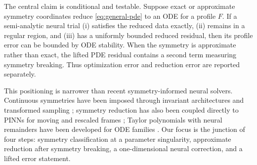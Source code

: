 \documentclass[11pt]{article}
\begin{document}
The central claim is conditional and testable.  Suppose exact or approximate symmetry coordinates reduce \cref{eq:general-pde} to an ODE for a profile $F$.  If a semi-analytic neural trial (i) satisfies the reduced data exactly, (ii) remains in a regular region, and (iii) has a uniformly bounded reduced residual, then its profile error can be bounded by ODE stability.  When the symmetry is approximate rather than exact, the lifted PDE residual contains a second term measuring symmetry breaking.  Thus optimization error and reduction error are reported separately.

This positioning is narrower than recent symmetry-informed neural solvers.  Continuous symmetries have been imposed through invariant architectures and transformed sampling \cite{zhang2023,akhound2024,arora2024}; symmetry reduction has also been coupled directly to PINNs for moving and rescaled frames \cite{kavousanakis2026}; Taylor polynomials with neural remainders have been developed for ODE families \cite{nagesh2025}.  Our focus is the junction of four steps: symmetry classification at a parameter singularity, approximate reduction after symmetry breaking, a one-dimensional neural correction, and a lifted error statement.
\end{document}
